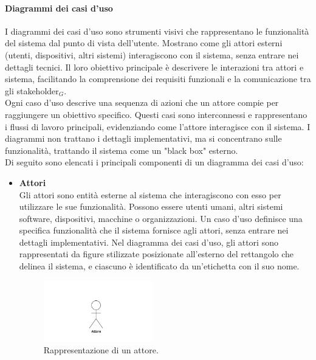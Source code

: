 \documentclass[10pt]{article}
\begin{document}
\begin{justify}
        \paragraph{Diagrammi dei casi d'uso}
        I diagrammi dei casi d'uso sono strumenti visivi che rappresentano le funzionalità del sistema dal punto di vista dell'utente. Mostrano come gli attori esterni (utenti, dispositivi, altri sistemi) interagiscono con il sistema, senza entrare nei dettagli tecnici. Il loro obiettivo principale è descrivere le interazioni tra attori e sistema, facilitando la comprensione dei requisiti funzionali e la comunicazione tra gli stakeholder$_G$.\\
        Ogni caso d'uso descrive una sequenza di azioni che un attore compie per raggiungere un obiettivo specifico. Questi casi sono interconnessi e rappresentano i flussi di lavoro principali, evidenziando come l'attore interagisce con il sistema. I diagrammi non trattano i dettagli implementativi, ma si concentrano sulle funzionalità, trattando il sistema come un "black box" esterno.\\
        Di seguito sono elencati i principali componenti di un diagramma dei casi d'uso:
        \begin{itemize}
            \item \textbf{Attori}\\
            Gli attori sono entità esterne al sistema che interagiscono con esso per utilizzare le sue funzionalità. Possono essere utenti umani, altri sistemi software, dispositivi, macchine o organizzazioni. Un caso d'uso definisce una specifica funzionalità che il sistema fornisce agli attori, senza entrare nei dettagli implementativi. Nel diagramma dei casi d'uso, gli attori sono rappresentati da figure stilizzate posizionate all'esterno del rettangolo che delinea il sistema, e ciascuno è identificato da un'etichetta con il suo nome.
            \begin{figure}[H]
            \centering
            \includegraphics[width=0.45\textwidth]{Attore.PNG}
            \caption{Rappresentazione di un attore.}
            \end{figure}


\end{itemize}
\end{justify}
\end{document}
